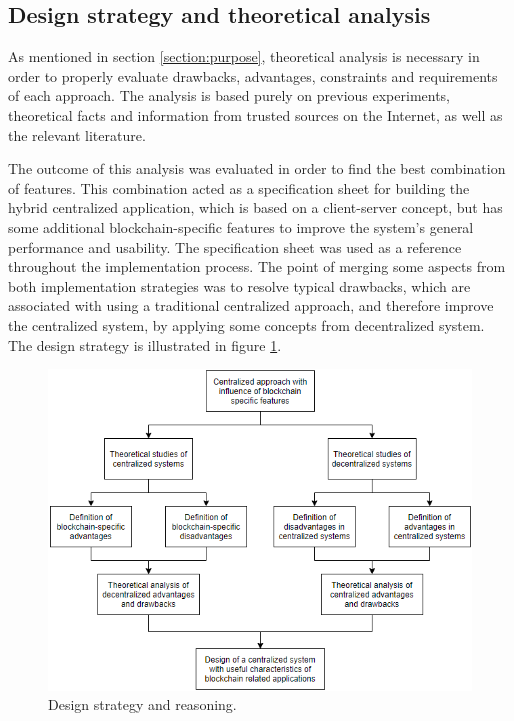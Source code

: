 \subsection{Design strategy and theoretical analysis}
As mentioned in section \ref{section:purpose}, theoretical analysis is necessary in order to properly evaluate drawbacks, advantages, constraints and requirements of each approach. The analysis is based purely on previous experiments, theoretical facts and information from trusted sources on the Internet, as well as the relevant literature. 

The outcome of this analysis was evaluated in order to find the best combination of features. This combination acted as a specification sheet for building the hybrid centralized application, which is based on a client-server concept, but has some additional blockchain-specific features to improve the system's general performance and usability. The specification sheet was used as a reference throughout the implementation process. The point of merging some aspects from both implementation strategies was to resolve typical drawbacks, which are associated with using a traditional centralized approach, and therefore improve the centralized system, by applying some concepts from decentralized system. The design strategy is illustrated in figure \ref{fig:flowdesign}.

\begin{figure}[H]
\centering
\includegraphics[scale=0.7]{images/designflowchart.png}
\caption{Design strategy and reasoning.}
\label{fig:flowdesign}
\end{figure}

